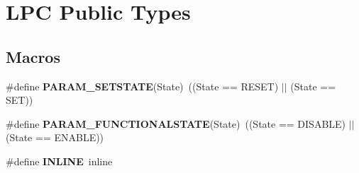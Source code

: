 \hypertarget{group___l_p_c___types___public___types}{\section{L\+P\+C Public Types}
\label{group___l_p_c___types___public___types}
}
\subsection*{Macros}
\begin{DoxyCompactItemize}
\item 
\hypertarget{group___l_p_c___types___public___types_gafb6827323e4c501477936a84bd733b4f}{\#define {\bfseries P\+A\+R\+A\+M\+\_\+\+S\+E\+T\+S\+T\+A\+T\+E}(State)~((State == R\+E\+S\+E\+T) $\vert$$\vert$ (State == S\+E\+T))}\label{group___l_p_c___types___public___types_gafb6827323e4c501477936a84bd733b4f}

\item 
\hypertarget{group___l_p_c___types___public___types_ga5475435ea985fe5abbf2048e87e3e682}{\#define {\bfseries P\+A\+R\+A\+M\+\_\+\+F\+U\+N\+C\+T\+I\+O\+N\+A\+L\+S\+T\+A\+T\+E}(State)~((State == D\+I\+S\+A\+B\+L\+E) $\vert$$\vert$ (State == E\+N\+A\+B\+L\+E))}\label{group___l_p_c___types___public___types_ga5475435ea985fe5abbf2048e87e3e682}

\item 
\hypertarget{group___l_p_c___types___public___types_ga2eb6f9e0395b47b8d5e3eeae4fe0c116}{\#define {\bfseries I\+N\+L\+I\+N\+E}~inline}\label{group___l_p_c___types___public___types_ga2eb6f9e0395b47b8d5e3eeae4fe0c116}

\end{DoxyCompactItemize}
